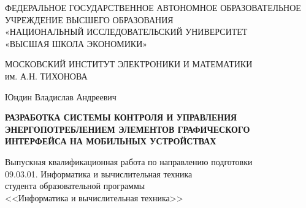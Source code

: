 
\thispagestyle{empty}
\begin{center}
    \small
    ФЕДЕРАЛЬНОЕ ГОСУДАРСТВЕННОЕ АВТОНОМНОЕ ОБРАЗОВАТЕЛЬНОЕ \\ УЧРЕЖДЕНИЕ ВЫСШЕГО ОБРАЗОВАНИЯ \\ 
    «НАЦИОНАЛЬНЫЙ ИССЛЕДОВАТЕЛЬСКИЙ УНИВЕРСИТЕТ \\ 
    «ВЫСШАЯ ШКОЛА ЭКОНОМИКИ» \\
        
    \vspace{5mm}
    
    МОСКОВСКИЙ ИНСТИТУТ ЭЛЕКТРОНИКИ И МАТЕМАТИКИ \\
    им. А.Н. ТИХОНОВА
    
    \normalsize
    \vspace{12mm}
    
    Юндин Владислав Андреевич
    
    \vspace{12mm}
    
    \textbf{РАЗРАБОТКА СИСТЕМЫ КОНТРОЛЯ И УПРАВЛЕНИЯ ЭНЕРГОПОТРЕБЛЕНИЕМ ЭЛЕМЕНТОВ ГРАФИЧЕСКОГО ИНТЕРФЕЙСА НА МОБИЛЬНЫХ УСТРОЙСТВАХ}
    
    \vspace{8mm}
    
    Выпускная квалификационная работа по направлению подготовки \\ 
    09.03.01. Информатика и вычислительная техника \\
    студента образовательной программы \\
    <<Информатика и вычислительная техника>>
\end{center}

\vspace{10mm}

